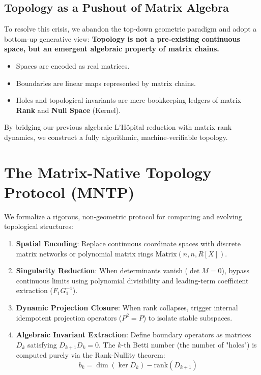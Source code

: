 \documentclass[11pt,a4paper]{article}
\begin{document}
\subsection{Topology as a Pushout of Matrix Algebra}
To resolve this crisis, we abandon the top-down geometric paradigm and adopt a bottom-up generative view: \textbf{Topology is not a pre-existing continuous space, but an emergent algebraic property of matrix chains.} 
\begin{itemize}
    \item Spaces are encoded as real matrices.
    \item Boundaries are linear maps represented by matrix chains.
    \item Holes and topological invariants are mere bookkeeping ledgers of matrix \textbf{Rank} and \textbf{Null Space} (Kernel).
\end{itemize}

By bridging our previous algebraic L'Hôpital reduction with matrix rank dynamics, we construct a fully algorithmic, machine-verifiable topology.

\section{The Matrix-Native Topology Protocol (MNTP)}

We formalize a rigorous, non-geometric protocol for computing and evolving topological structures:

\begin{enumerate}
    \item \textbf{Spatial Encoding}: Replace continuous coordinate spaces with discrete matrix networks or polynomial matrix rings $\text{Matrix}(n, n, R[X])$.
    \item \textbf{Singularity Reduction}: When determinants vanish ($\det M = 0$), bypass continuous limits using polynomial divisibility and leading-term coefficient extraction ($F_1 G_1^{-1}$).
    \item \textbf{Dynamic Projection Closure}: When rank collapses, trigger internal idempotent projection operators ($P^2 = P$) to isolate stable subspaces.
    \item \textbf{Algebraic Invariant Extraction}: Define boundary operators as matrices $D_k$ satisfying $D_{k+1} D_k = 0$. The $k$-th Betti number (the number of "holes") is computed purely via the Rank-Nullity theorem:
    $$b_k = \dim(\ker D_k) - \text{rank}(D_{k+1})$$
\end{enumerate}
\end{document}
